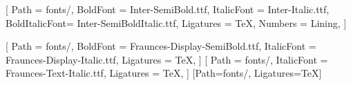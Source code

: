 \usepackage{fontspec}
\setmainfont{Inter-Regular.ttf}[
  Path          = fonts/,
  BoldFont      = Inter-SemiBold.ttf,
  ItalicFont    = Inter-Italic.ttf,
  BoldItalicFont= Inter-SemiBoldItalic.ttf,
  Ligatures     = TeX,
  Numbers       = Lining,
]

\newfontfamily{}[
  Path       = fonts/,
  BoldFont   = Fraunces-Display-SemiBold.ttf,
  ItalicFont = Fraunces-Display-Italic.ttf,
  Ligatures  = TeX,
]
\newfontfamily{}[
  Path       = fonts/,
  ItalicFont = Fraunces-Text-Italic.ttf,
  Ligatures  = TeX,
]
\newfontfamily{}[Path=fonts/, Ligatures=TeX]
\usepackage{booktabs}
\usepackage{longtable}
\usepackage{array}
\usepackage{fancyhdr}
\usepackage{titlesec}
\usepackage{xcolor}
\usepackage{tcolorbox}
\usepackage{enumitem}
\usepackage{float}
\usepackage[normalem]{ulem}

